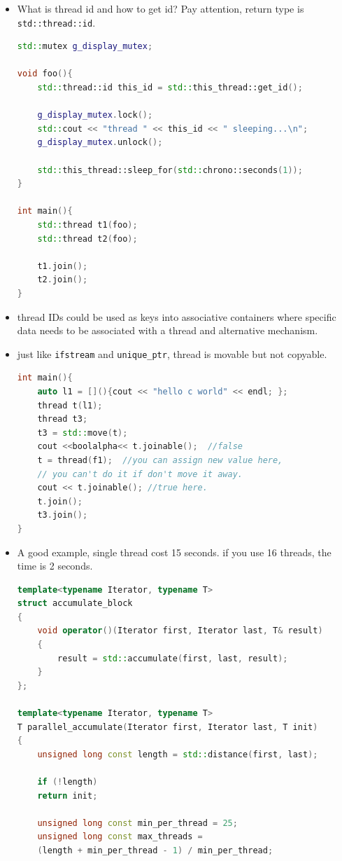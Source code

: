 \documentclass[a4paper,11pt,twoside]{book}
\begin{document}
\begin{itemize}
	\item What is thread id and how to get id? Pay attention, return type is \texttt{std::thread::id}.
\begin{lstlisting}[frame=single, language=c++]
std::mutex g_display_mutex;

void foo(){
	std::thread::id this_id = std::this_thread::get_id();
	
	g_display_mutex.lock();
	std::cout << "thread " << this_id << " sleeping...\n";
	g_display_mutex.unlock();
	
	std::this_thread::sleep_for(std::chrono::seconds(1));
}

int main(){
	std::thread t1(foo);
	std::thread t2(foo);
	
	t1.join();
	t2.join();
}
\end{lstlisting}		
	
	\item thread IDs could be used as keys into associative containers where specific data needs to be associated with a thread and alternative mechanism.
	
	\item just like \texttt{ifstream} and \texttt{unique\_ptr}, thread is movable but not copyable. 
\begin{lstlisting}[frame=single, language=c++]
int main(){
	auto l1 = [](){cout << "hello c world" << endl; };
	thread t(l1);   
	thread t3;
	t3 = std::move(t);
	cout <<boolalpha<< t.joinable();  //false
	t = thread(f1);  //you can assign new value here,
	// you can't do it if don't move it away.
	cout << t.joinable(); //true here.
	t.join();
	t3.join();
}	
\end{lstlisting}	
	
	\item A good example, single thread cost 15 seconds. if you use 16 threads, the time is 2 seconds.
\begin{lstlisting}[frame=single, language=c++]
template<typename Iterator, typename T>
struct accumulate_block
{
	void operator()(Iterator first, Iterator last, T& result)
	{
		result = std::accumulate(first, last, result);
	}
};

template<typename Iterator, typename T>
T parallel_accumulate(Iterator first, Iterator last, T init)
{
	unsigned long const length = std::distance(first, last);
	
	if (!length)
	return init;
	
	unsigned long const min_per_thread = 25;
	unsigned long const max_threads =
	(length + min_per_thread - 1) / min_per_thread;
	

\end{lstlisting}
\end{itemize}
\end{document}
